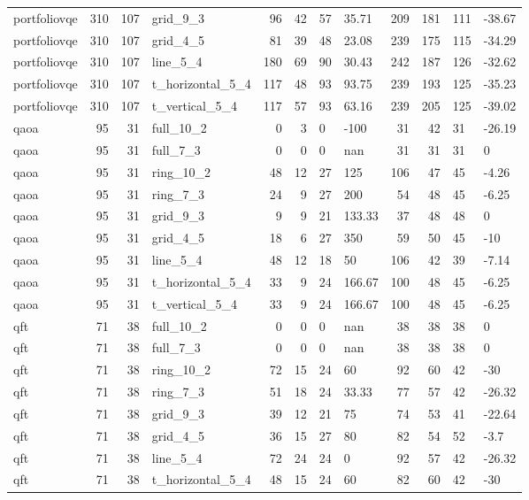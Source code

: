 \begin{longtable}{lrrlrrllrrll}
portfoliovqe & 310 & 107 & grid\_9\_3 & 96 & 42 & 57 & 35.71 & 209 & 181 & 111 & -38.67 \\
portfoliovqe & 310 & 107 & grid\_4\_5 & 81 & 39 & 48 & 23.08 & 239 & 175 & 115 & -34.29 \\
portfoliovqe & 310 & 107 & line\_5\_4 & 180 & 69 & 90 & 30.43 & 242 & 187 & 126 & -32.62 \\
portfoliovqe & 310 & 107 & t\_horizontal\_5\_4 & 117 & 48 & 93 & 93.75 & 239 & 193 & 125 & -35.23 \\
portfoliovqe & 310 & 107 & t\_vertical\_5\_4 & 117 & 57 & 93 & 63.16 & 239 & 205 & 125 & -39.02 \\
qaoa & 95 & 31 & full\_10\_2 & 0 & 3 & 0 & -100 & 31 & 42 & 31 & -26.19 \\
qaoa & 95 & 31 & full\_7\_3 & 0 & 0 & 0 & nan & 31 & 31 & 31 & 0 \\
qaoa & 95 & 31 & ring\_10\_2 & 48 & 12 & 27 & 125 & 106 & 47 & 45 & -4.26 \\
qaoa & 95 & 31 & ring\_7\_3 & 24 & 9 & 27 & 200 & 54 & 48 & 45 & -6.25 \\
qaoa & 95 & 31 & grid\_9\_3 & 9 & 9 & 21 & 133.33 & 37 & 48 & 48 & 0 \\
qaoa & 95 & 31 & grid\_4\_5 & 18 & 6 & 27 & 350 & 59 & 50 & 45 & -10 \\
qaoa & 95 & 31 & line\_5\_4 & 48 & 12 & 18 & 50 & 106 & 42 & 39 & -7.14 \\
qaoa & 95 & 31 & t\_horizontal\_5\_4 & 33 & 9 & 24 & 166.67 & 100 & 48 & 45 & -6.25 \\
qaoa & 95 & 31 & t\_vertical\_5\_4 & 33 & 9 & 24 & 166.67 & 100 & 48 & 45 & -6.25 \\
qft & 71 & 38 & full\_10\_2 & 0 & 0 & 0 & nan & 38 & 38 & 38 & 0 \\
qft & 71 & 38 & full\_7\_3 & 0 & 0 & 0 & nan & 38 & 38 & 38 & 0 \\
qft & 71 & 38 & ring\_10\_2 & 72 & 15 & 24 & 60 & 92 & 60 & 42 & -30 \\
qft & 71 & 38 & ring\_7\_3 & 51 & 18 & 24 & 33.33 & 77 & 57 & 42 & -26.32 \\
qft & 71 & 38 & grid\_9\_3 & 39 & 12 & 21 & 75 & 74 & 53 & 41 & -22.64 \\
qft & 71 & 38 & grid\_4\_5 & 36 & 15 & 27 & 80 & 82 & 54 & 52 & -3.7 \\
qft & 71 & 38 & line\_5\_4 & 72 & 24 & 24 & 0 & 92 & 57 & 42 & -26.32 \\
qft & 71 & 38 & t\_horizontal\_5\_4 & 48 & 15 & 24 & 60 & 82 & 60 & 42 & -30 \\

\end{longtable}
